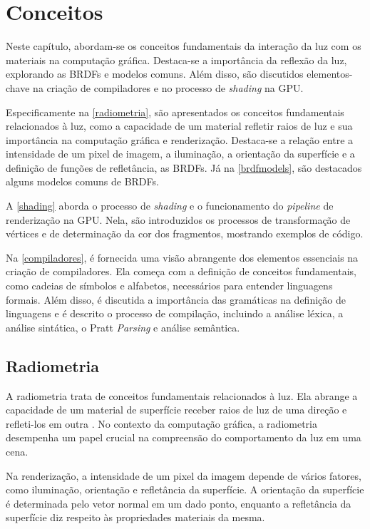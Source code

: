 \documentclass[english,
               brazil,
               bsc] %
               {dcomp-abntex2}
\begin{document}
\chapter{Conceitos} \label{conceitos}


Neste capítulo, abordam-se os conceitos fundamentais da interação da luz com os materiais na computação gráfica. Destaca-se a importância da reflexão da luz, explorando as BRDFs e modelos comuns. Além disso, são discutidos elementos-chave na criação de compiladores e no processo de \textit{shading} na GPU.


Especificamente na \autoref{radiometria}, são apresentados os conceitos fundamentais relacionados à luz, como a capacidade de um material refletir raios de luz e sua importância na computação gráfica e renderização. Destaca-se a relação entre a intensidade de um pixel de imagem, a iluminação, a orientação da superfície e a definição de funções de refletância, as BRDFs. Já na \autoref{brdfmodels}, são destacados alguns modelos comuns de BRDFs.


A \autoref{shading} aborda o processo de \textit{shading} e o funcionamento do \textit{pipeline} de renderização na GPU. Nela, são introduzidos os processos de transformação de vértices e de determinação da cor dos fragmentos, mostrando exemplos de código. 


Na \autoref{compiladores}, é fornecida uma visão abrangente dos elementos essenciais na criação de compiladores. Ela começa com a definição de conceitos fundamentais, como cadeias de símbolos e alfabetos, necessários para entender linguagens formais. Além disso, é discutida a importância das gramáticas na definição de linguagens e é descrito o processo de compilação, incluindo a análise léxica, a análise sintática, o Pratt \textit{Parsing} e análise semântica.






\section{Radiometria} \label{radiometria}


A radiometria trata de conceitos fundamentais relacionados à luz. Ela abrange a capacidade de um material de superfície receber raios de luz de uma direção e refleti-los em outra 
\cite{radiometry_introduction}. No contexto da computação gráfica, a radiometria desempenha um papel crucial na compreensão do comportamento da luz em uma cena.


Na renderização, a intensidade de um pixel da imagem depende de vários fatores, como iluminação, orientação e refletância da superfície. A orientação da superfície é determinada pelo vetor normal em um dado ponto, enquanto a refletância da superfície diz respeito às propriedades materiais da mesma.
\end{document}

